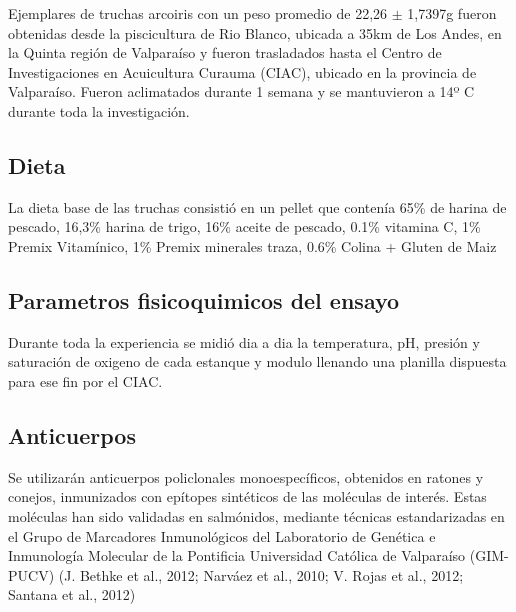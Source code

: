 \documentclass[12pt,a4paper,oneside]{scrbook}
\begin{document}
Ejemplares de truchas arcoiris con un peso promedio de 22,26 $\pm$
1,7397g fueron obtenidas desde la piscicultura de Rio Blanco, ubicada a
35km de Los Andes, en la Quinta región de Valparaíso y fueron
trasladados hasta el Centro de Investigaciones en Acuicultura Curauma
(CIAC), ubicado en la provincia de Valparaíso. Fueron aclimatados
durante 1 semana y se mantuvieron a 14º C durante toda la investigación.

\subsection{Dieta}

La dieta base de las truchas consistió en un pellet que contenía 65\% de
harina de pescado, 16,3\% harina de trigo, 16\% aceite de pescado, 0.1\%
vitamina C, 1\% Premix Vitamínico, 1\% Premix minerales traza, 0.6\%
Colina + Gluten de Maiz

\subsection{Parametros fisicoquimicos del ensayo}

Durante toda la experiencia se midió dia a dia la temperatura, pH,
presión y saturación de oxigeno de cada estanque y modulo llenando una
planilla dispuesta para ese fin por el CIAC.

\subsection{Anticuerpos}

Se utilizarán anticuerpos policlonales monoespecíficos, obtenidos en
ratones y conejos, inmunizados con epítopes sintéticos de las moléculas
de interés. Estas moléculas han sido validadas en salmónidos, mediante
técnicas estandarizadas en el Grupo de Marcadores Inmunológicos del
Laboratorio de Genética e Inmunología Molecular de la Pontificia
Universidad Católica de Valparaíso (GIM-PUCV) (J. Bethke et al., 2012;
Narváez et al., 2010; V. Rojas et al., 2012; Santana et al., 2012)
\end{document}
